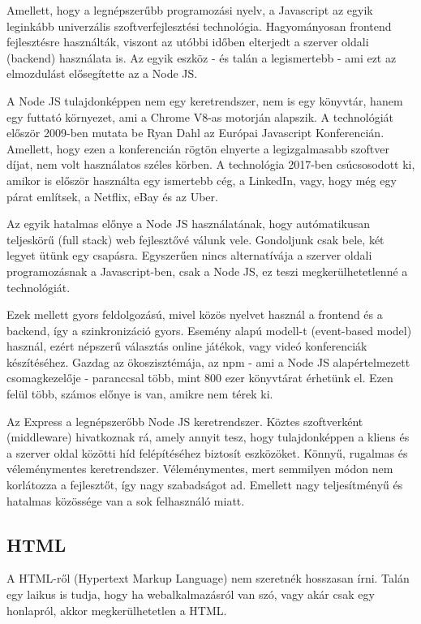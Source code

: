 Amellett, hogy a legnépszerűbb programozási nyelv, a Javascript az egyik leginkább univerzális szoftverfejlesztési technológia. Hagyományosan frontend fejlesztésre használták, viszont az utóbbi időben elterjedt a szerver oldali (backend) használata is. Az egyik eszköz - és talán a legismertebb - ami ezt az elmozdulást elősegítette az a Node JS.

A Node JS tulajdonképpen nem egy keretrendszer, nem is egy könyvtár, hanem egy futtató környezet, ami a Chrome V8-as motorján alapszik. A technológiát először 2009-ben mutata be Ryan Dahl az Európai Javascript Konferencián. Amellett, hogy ezen a konferencián rögtön elnyerte a legizgalmasabb szoftver díjat, nem volt használatos széles körben. A technológia 2017-ben csúcsosodott ki, amikor is először használta egy ismertebb cég, a LinkedIn, vagy, hogy még egy párat említsek, a Netflix, eBay és az Uber.

Az egyik hatalmas előnye a Node JS használatának, hogy autómatikusan teljeskörű (full stack) web fejlesztővé válunk vele. Gondoljunk csak bele, két legyet ütünk egy csapásra. Egyszerűen nincs alternatívája a szerver oldali programozásnak a Javascript-ben, csak a Node JS, ez teszi megkerülhetetlenné a technológiát.

Ezek mellett gyors feldolgozású, mivel közös nyelvet használ a frontend és a backend, így a szinkronizáció gyors. Esemény alapú modell-t (event-based model) használ, ezért népszerű választás online játékok, vagy videó konferenciák készítéséhez. Gazdag az ökoszisztémája, az npm - ami a Node JS alapértelmezett csomagkezelője - paranccsal több, mint 800 ezer könyvtárat érhetünk el. Ezen felül több, számos előnye is van, amikre nem térek ki.

Az Express a legnépszerőbb Node JS keretrendszer. Köztes szoftverként (middleware) hivatkoznak rá, amely annyit tesz, hogy tulajdonképpen a kliens és a szerver oldal közötti híd felépítéséhez biztosít eszközöket. Könnyű, rugalmas és véleménymentes keretrendszer. Véleménymentes, mert semmilyen módon nem korlátozza a fejlesztőt, így nagy szabadságot ad. Emellett nagy teljesítményű és hatalmas közössége van a sok felhasználó miatt.

\subsection{HTML}
A HTML-ről (Hypertext Markup Language) nem szeretnék hosszasan írni. Talán egy laikus is tudja, hogy ha webalkalmazásról van szó, vagy akár csak egy honlapról, akkor megkerülhetetlen a HTML.

